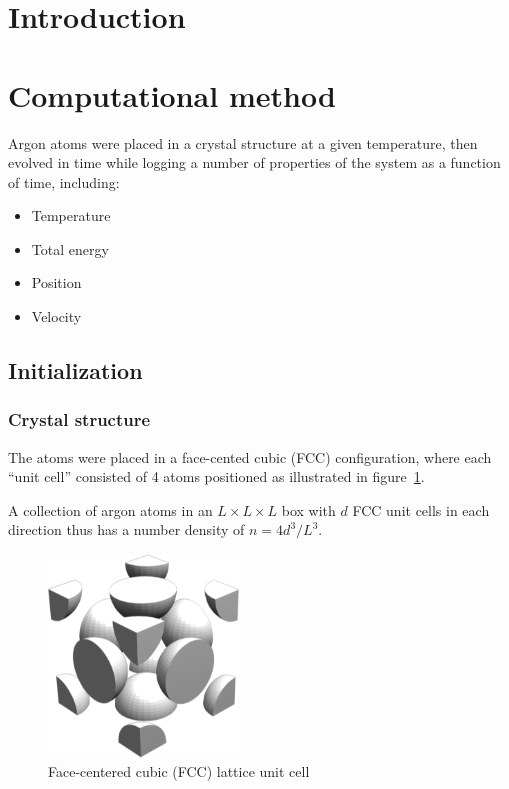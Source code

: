 \documentclass[twocolumn]{revtex4}
\begin{document}
\section{Introduction}

\section{Computational method}

Argon atoms were placed in a crystal structure at a given temperature, then evolved in time while logging a number of properties of the system as a function of time, including:
\begin{itemize}
\item Temperature
\item Total energy
\item Position
\item Velocity
\end{itemize}

\subsection{Initialization}

\subsubsection{Crystal structure}

The atoms were placed in a face-cented cubic (FCC) configuration, where each ``unit cell'' consisted of 4 atoms positioned as illustrated in figure~\ref{fig:fcc}.

A collection of argon atoms in an $L \times L \times L$ box with $d$ FCC unit cells in each direction thus has a number density of $n = 4d^3/L^3$.

\begin{figure}[htb]
\begin{center}
\leavevmode
\includegraphics[width=0.45\textwidth]{fcc.png}
\end{center}
\caption{Face-centered cubic (FCC) lattice unit cell}
\label{fig:fcc}
\end{figure}
\end{document}
